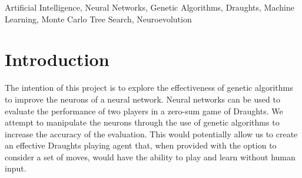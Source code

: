 \documentclass[12pt,a4paper]{article}
\begin{document}
\begin{abstract}
    {\bf Results}


    The system has shown to perform considerably without any training, and has shown to improve over time. For different search depths, the net learning rate was positive. However, the wide scope of the adjustments afforded may have impacted the learning rate and has shown to be volatile at some situations.

    {\bf Conclusion}

    For problems that do not have
    Under the premise that the fitness function that is well defined, neuroevolution is a valid alternative to problems with novel domains. 

    The solution is very appropiate for games that do not involve the use of training data.
    When using genetic algorithms with feed-forward neural networks, it 
    The robustness of the system is quite volatile, and is best paired with mutation methods that are not heavily reliant on entropy.

\end{abstract}
\begin{keywords}
    Artificial Intelligence, Neural Networks, Genetic Algorithms, Draughts, Machine Learning, Monte Carlo Tree Search, Neuroevolution
\end{keywords}
\section{Introduction}
    The intention of this project is to explore the effectiveness of genetic algorithms to improve the neurons of a neural network. Neural networks can be used to evaluate the performance of two players in a zero-sum game of Draughts. We attempt to manipulate the neurons through the use of genetic algorithms to increase the accuracy of the evaluation. This would potentially allow us to create an effective Draughts playing agent that, when provided with the option to consider a set of moves, would have the ability to play and learn without human input.
\end{document}
